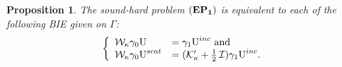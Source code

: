 \documentclass[1pt]{article}
\newcommand{\be}{\begin{equation}}
\newcommand{\ee}{\end{equation}}
\newcommand{\mK}{\mathcal{K}}
\newcommand{\mI}{\nobreak\hspace{.16667em plus .08333em}\mathcal{I}}
\newcommand{\U}{{\text{U}}}
\newtheorem{proposition}{Proposition}
\begin{document}
\begin{proposition}
The \emph{sound-hard} problem ${\bf (EP_1)}$ is equivalent to each of the following BIE given on $\Gamma$:
\be
\left\{
\label{eq:B_EP_0}
\begin{array}{ll}
\mathcal{W}_\kappa \gamma_0 \U &= \gamma_1 \U^{inc}\text{ and }\\
\mathcal{W}_\kappa \gamma_0 \U^{scat} &= (\mK'_\kappa+\frac{1}{2}\mI) \gamma_1 \U^{inc}.
\end{array}
\right.
\ee
\end{proposition}
\end{document}
